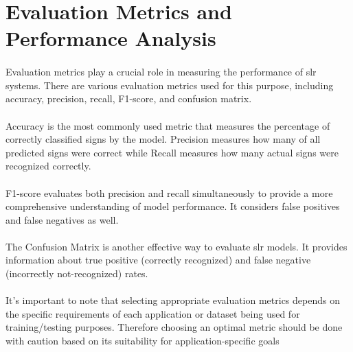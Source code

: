\section{Evaluation Metrics and Performance Analysis}
\paragraph{}
Evaluation metrics play a crucial role in measuring the performance of \ac{slr} systems. There are various evaluation metrics used for this purpose, including accuracy, precision, recall, F1-score, and confusion matrix.
\paragraph{}
Accuracy is the most commonly used metric that measures the percentage of correctly classified signs by the model. Precision measures how many of all predicted signs were correct while Recall measures how many actual signs were recognized correctly.
\paragraph{}
F1-score evaluates both precision and recall simultaneously to provide a more comprehensive understanding of model performance. It considers false positives and false negatives as well.
\paragraph{}
The Confusion Matrix is another effective way to evaluate \ac{slr} models. It provides information about true positive (correctly recognized) and false negative (incorrectly not-recognized) rates.
\paragraph{}
It's important to note that selecting appropriate evaluation metrics depends on the specific requirements of each application or dataset being used for training/testing purposes. Therefore choosing an optimal metric should be done with caution based on its suitability for application-specific goals